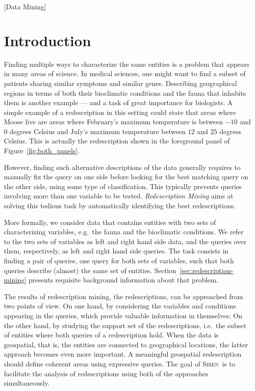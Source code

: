 \documentclass{sig-alternate}
\newcommand{\note}[1]{{\color{red}#1}}
\newcommand{\Siren}{\textsc{Siren}}
\begin{document}
[Data Mining]


\section{Introduction}
Finding multiple ways to characterize the same entities is a problem
that appears in many areas of science.  In medical sciences, one might
want to find a subset of patients sharing similar symptoms and similar
genes. Describing geographical regions in terms of both their
bioclimatic conditions and the fauna that inhabits them is another
example --- and a task of great importance for biologists.  A 
simple example of a redescription in this setting could state that areas
where Moose live are areas where February's maximum temperature is
between $-10$ and $0$ degrees Celsius and July's maximum temperature
between $12$ and $25$ degrees Celsius. This is actually the
redescription shown in the foreground panel of
Figure~\ref{fig:both_panels}.

However, finding such alternative descriptions of the data
generally requires to manually fix the query on one side before
looking for the best matching query on the other side, using some type
of classification. This typically prevents queries involving more than
one variable to be tested. \emph{Redescription Mining} aims at
solving this tedious task by automatically identifying the best
redescriptions.

More formally, we consider data that contains entities with two sets
of characterizing variables, e.g.\ the fauna and the bioclimatic
conditions. We refer to the two sets of variables as left and right
hand side data, and the queries over them, respectively, as left and
right hand side queries.  The task consists in finding a pair of
queries, one query for both sets of variables, such that both queries
describe (almost) the same set of entities.
Section~\ref{sec:redescription-mining} presents requisite
background information about that problem.

The results of redescription mining, the redescriptions, can be
approached from two points of view. On one hand, by considering the
variables and conditions appearing in the queries, which provide
valuable information in themselves; On the other hand, by studying the
support set of the redescriptions, i.e.\ the subset of entities where
both queries of a redescription hold. When the data is geospatial,
that is, the entities are connected to geographical locations, the
latter approach becomes even more important. A meaningful geospatial
redescription should define coherent areas using expressive
queries. The goal of \Siren\ is to facilitate the analysis of
redescriptions using both of the approaches simultaneously.
\end{document}
